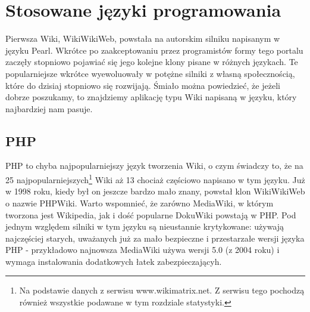 \documentclass{article}
\begin{document}

			
	

\newpage
\section{Stosowane języki programowania}
Pierwsza Wiki, WikiWikiWeb, powstała na autorskim silniku napisanym w języku Pearl. Wkrótce po zaakceptowaniu przez programistów formy tego portalu zaczęły stopniowo pojawiać się jego kolejne klony pisane w różnych językach. Te popularniejsze wkrótce wyewoluowały w potężne silniki z własną społecznością, które do dzisiaj stopniowo się rozwijają. Śmiało można powiedzieć, że jeżeli dobrze poszukamy, to znajdziemy aplikację typu Wiki napisaną w języku, który najbardziej nam pasuje. 
	\subsection{PHP} 
	PHP to chyba najpopularniejszy język tworzenia Wiki, o czym świadczy to, że na 25 najpopularniejszych\footnote{Na podstawie danych z serwisu www.wikimatrix.net. Z serwisu tego pochodzą również wszystkie podawane w tym rozdziale statystyki.} Wiki aż 13 chociaż częściowo napisano w tym języku. Już w 1998 roku, kiedy był on jeszcze bardzo mało znany, powstał klon WikiWikiWeb o nazwie PHPWiki. Warto wspomnieć, że zarówno MediaWiki, w którym tworzona jest Wikipedia, jak i dość popularne DokuWiki powstają w PHP. Pod jednym względem silniki w tym języku są nieustannie krytykowane: używają najczęściej starych, uważanych już za mało bezpieczne i przestarzałe wersji języka PHP - przykładowo najnowsza MediaWiki używa wersji 5.0 (z 2004 roku) i wymaga instalowania dodatkowych łatek zabezpieczającyh.  
\end{document}
